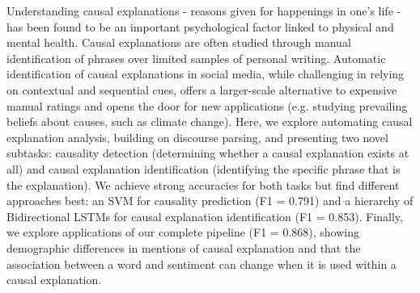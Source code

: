 Understanding causal explanations - reasons given for happenings in one's life - has been found to be an important psychological factor linked to physical and mental health. Causal explanations are often studied through manual identification of phrases over limited samples of personal writing. Automatic identification of causal explanations in social media, while challenging in relying on contextual and sequential cues, offers a larger-scale alternative to expensive manual ratings and opens the door for new applications (e.g. studying prevailing beliefs about causes, such as climate change). Here, we explore automating causal explanation analysis, building on discourse parsing, and presenting two novel subtasks: causality detection (determining whether a causal explanation exists at all) and causal explanation identification (identifying the specific phrase that is the explanation). We achieve strong accuracies for both tasks but find different approaches best: an SVM for causality prediction (F1 = 0.791) and a hierarchy of Bidirectional LSTMs for causal explanation identification (F1 = 0.853). Finally, we explore applications of our complete pipeline (F1 = 0.868), showing demographic differences in mentions of causal explanation and that the association between a word and sentiment can change when it is used within a causal explanation.
